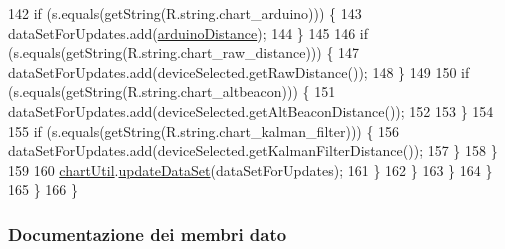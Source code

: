 \begin{DoxyCode}
142                                 \textcolor{keywordflow}{if} (s.equals(getString(R.string.chart\_arduino))) \{
143                                     dataSetForUpdates.add(\hyperlink{classit_1_1unibo_1_1torsello_1_1bluetoothpositioning_1_1fragment_1_1DeviceChartFragment_ac62d852fec179fcadd6caa94d4087d67_ac62d852fec179fcadd6caa94d4087d67}{arduinoDistance});
144                                 \}
145 
146                                 \textcolor{keywordflow}{if} (s.equals(getString(R.string.chart\_raw\_distance))) \{
147                                     dataSetForUpdates.add(deviceSelected.getRawDistance());
148                                 \}
149 
150                                 \textcolor{keywordflow}{if} (s.equals(getString(R.string.chart\_altbeacon))) \{
151                                     dataSetForUpdates.add(deviceSelected.getAltBeaconDistance());
152 
153                                 \}
154 
155                                 \textcolor{keywordflow}{if} (s.equals(getString(R.string.chart\_kalman\_filter))) \{
156                                     dataSetForUpdates.add(deviceSelected.getKalmanFilterDistance());
157                                 \}
158                             \}
159 
160                             \hyperlink{classit_1_1unibo_1_1torsello_1_1bluetoothpositioning_1_1fragment_1_1DeviceChartFragment_ad28ad16d89e075ea2e572bba9b24bc4e_ad28ad16d89e075ea2e572bba9b24bc4e}{chartUtil}.\hyperlink{classit_1_1unibo_1_1torsello_1_1bluetoothpositioning_1_1util_1_1ChartUtil_aa9bda04d2c2058fb1b3fcd72c5a7471d_aa9bda04d2c2058fb1b3fcd72c5a7471d}{updateDataSet}(dataSetForUpdates);
161                         \}
162                     \}
163                 \}
164             \}
165         \}
166     \}
\end{DoxyCode}


\subsubsection{Documentazione dei membri dato}
\hypertarget{classit_1_1unibo_1_1torsello_1_1bluetoothpositioning_1_1fragment_1_1DeviceChartFragment_ac62d852fec179fcadd6caa94d4087d67_ac62d852fec179fcadd6caa94d4087d67}{}\label{classit_1_1unibo_1_1torsello_1_1bluetoothpositioning_1_1fragment_1_1DeviceChartFragment_ac62d852fec179fcadd6caa94d4087d67_ac62d852fec179fcadd6caa94d4087d67} 

